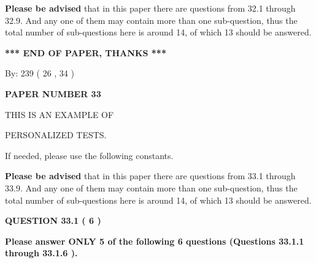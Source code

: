 \documentclass[12pt]{article}
\begin{document}
{\textbf{\large{Please be advised}}} that in this paper there are questions from
32.1 through
32.9.
And any one of them may contain more than one sub-question, thus the total number
of sub-questions here is around 14, of which
13 should be answered.
 
   
   
   
   
\vspace{1.0in} 
{\textbf{\large{ *** END OF PAPER, THANKS *** }}} 
   
   
\hspace{1.0in} By: 
         239 (          26 ,           34 )
   
   
   
   
\newpage 
\setcounter{page}{ 
    33001 } 
   
   
   
   
 {\textbf{ \Large{ PAPER NUMBER           33  }}}
   
   
\vspace{0.2in}
   
   
   
   
   
   
 \vspace{0.2in}
 
 
{\Huge  THIS IS AN EXAMPLE OF}
 
{\Huge  PERSONALIZED TESTS. }
 
If needed, please use the following constants.
 
 
 
{\textbf{\large{Please be advised}}} that in this paper there are questions from
33.1 through
33.9.
And any one of them may contain more than one sub-question, thus the total number
of sub-questions here is around 14, of which
13 should be answered.
 
\vspace{0.3in}
 
 
   
   
  
\vspace{0.2in}
  
{\textbf{\Large{QUESTION
33.1 
 (           6 )
}}}
  
  
{\textbf{\Large{Please answer ONLY  %
           5  %
 of the following  %
           6  %
 questions (Questions  %
33.1.1 %
 through  %
33.1.6 %
 ). }}}
   
   
  
\end{document}
